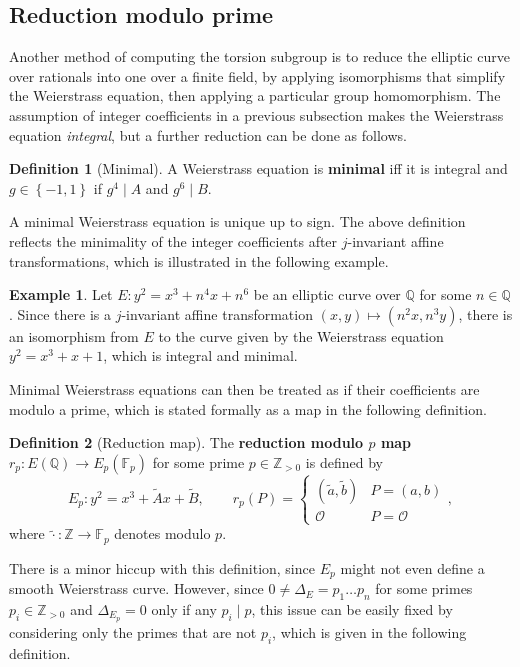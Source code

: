 \documentclass{article}
\newcommand{\F}{\mathbb{F}}
\newcommand{\Z}{\mathbb{Z}}
\newcommand{\Q}{\mathbb{Q}}
\newcommand{\rb}[1]{\left( #1 \right)}
\newcommand{\cb}[1]{\left\{ #1 \right\}}
\theoremstyle{definition}\newtheorem*{definition}{Definition}
\theoremstyle{definition}\newtheorem*{example}{Example}
\theoremstyle{definition}\newtheorem*{remark}{Remark}
\begin{document}
\pagebreak

\subsection{Reduction modulo prime}

Another method of computing the torsion subgroup is to reduce the elliptic curve over rationals into one over a finite field, by applying isomorphisms that simplify the Weierstrass equation, then applying a particular group homomorphism. The assumption of integer coefficients in a previous subsection makes the Weierstrass equation \emph{integral}, but a further reduction can be done as follows.

\begin{definition}[Minimal]
A Weierstrass equation is \textbf{minimal} iff it is integral and $ g \in \cb{-1, 1} $ if $ g^4 \mid A $ and $ g^6 \mid B $.
\end{definition}

A minimal Weierstrass equation is unique up to sign. The above definition reflects the minimality of the integer coefficients after $ j $-invariant affine transformations, which is illustrated in the following example.

\begin{example}
Let $ E : y^2 = x^3 + n^4x + n^6 $ be an elliptic curve over $ \Q $ for some $ n \in \Q $. Since there is a $ j $-invariant affine transformation $ \rb{x, y} \mapsto \rb{n^2x, n^3y} $, there is an isomorphism from $ E $ to the curve given by the Weierstrass equation $ y^2 = x^3 + x + 1 $, which is integral and minimal.
\end{example}

Minimal Weierstrass equations can then be treated as if their coefficients are modulo a prime, which is stated formally as a map in the following definition.

\begin{definition}[Reduction map]
The \textbf{reduction modulo $ p $ map} $ r_p : E\rb{\Q} \to E_p\rb{\F_p} $ for some prime $ p \in \Z_{> 0} $ is defined by
$$ E_p : y^2 = x^3 + \tilde{A}x + \tilde{B}, \qquad r_p\rb{P} = \begin{cases} \rb{\tilde{a}, \tilde{b}} & P = \rb{a, b} \\ \mathcal{O} & P = \mathcal{O} \end{cases}, $$
where $ \tilde{\cdot} : \Z \to \F_p $ denotes modulo $ p $.
\end{definition}

There is a minor hiccup with this definition, since $ E_p $ might not even define a smooth Weierstrass curve. However, since $ 0 \ne \Delta_E = p_1 \dots p_n $ for some primes $ p_i \in \Z_{> 0} $ and $ \Delta_{E_p} = 0 $ only if any $ p_i \mid p $, this issue can be easily fixed by considering only the primes that are not $ p_i $, which is given in the following definition.
\end{document}
